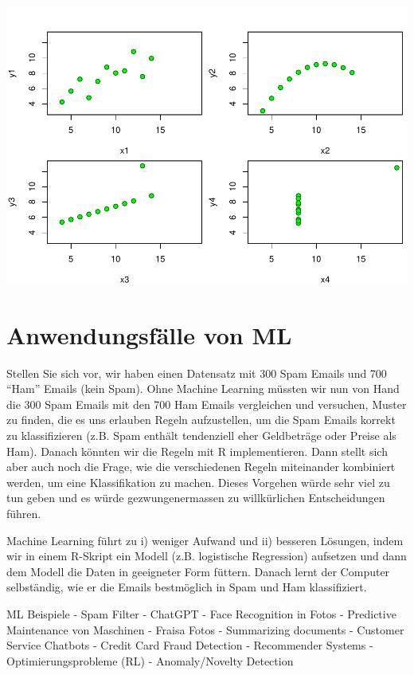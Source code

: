 \documentclass[
]{book}
\begin{document}
\includegraphics{01-intro_files/figure-latex/anscombe-1.pdf}

\hypertarget{anwendungsfuxe4lle-von-ml}{%
\section{Anwendungsfälle von ML}\label{anwendungsfuxe4lle-von-ml}}

Stellen Sie sich vor, wir haben einen Datensatz mit 300 Spam Emails und 700 ``Ham'' Emails (kein Spam). Ohne Machine Learning müssten wir nun von Hand die 300 Spam Emails mit den 700 Ham Emails vergleichen und versuchen, Muster zu finden, die es uns erlauben Regeln aufzustellen, um die Spam Emails korrekt zu klassifizieren (z.B. Spam enthält tendenziell eher Geldbeträge oder Preise als Ham). Danach könnten wir die Regeln mit R implementieren. Dann stellt sich aber auch noch die Frage, wie die verschiedenen Regeln miteinander kombiniert werden, um eine Klassifikation zu machen. Dieses Vorgehen würde sehr viel zu tun geben und es würde gezwungenermassen zu willkürlichen Entscheidungen führen.

Machine Learning führt zu i) weniger Aufwand und ii) besseren Lösungen, indem wir in einem R-Skript ein Modell (z.B. logistische Regression) aufsetzen und dann dem Modell die Daten in geeigneter Form füttern. Danach lernt der Computer selbständig, wie er die Emails bestmöglich in Spam und Ham klassifiziert.

ML Beispiele
- Spam Filter
- ChatGPT
- Face Recognition in Fotos
- Predictive Maintenance von Maschinen
- Fraisa Fotos
- Summarizing documents
- Customer Service Chatbots
- Credit Card Fraud Detection
- Recommender Systems
- Optimierungsprobleme (RL)
- Anomaly/Novelty Detection
\end{document}
